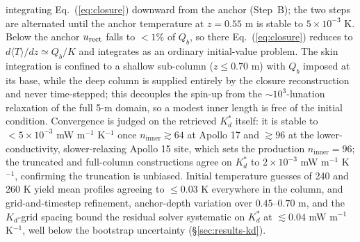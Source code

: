 \documentclass[11pt]{article}
\begin{document}
integrating Eq.~(\ref{eq:closure}) downward from the anchor (Step~B);
the two steps are alternated until the anchor temperature at $z=0.55$ m
is stable to $5\times10^{-3}$ K. Below the anchor $u_{\rm rect}$ falls
to $<\!1\%$ of $Q_b$, so there Eq.~(\ref{eq:closure}) reduces to
$d\langle T\rangle/dz\simeq Q_b/K$ and integrates as an ordinary
initial-value problem. The skin integration is
confined to a shallow sub-column ($z\le 0.70$ m) with $Q_b$ imposed at
its base, while the deep column is supplied entirely by the closure
reconstruction and never time-stepped; this decouples the spin-up from
the $\sim$$10^3$-lunation relaxation of the full 5-m domain, so a modest
inner length is free of the initial condition. Convergence is judged on
the retrieved $K_d^{*}$ itself: it is stable to
$<\!5\times10^{-3}$ mW m$^{-1}$ K$^{-1}$ once $n_\mathrm{inner}\gtrsim 64$
at Apollo 17 and $\gtrsim 96$ at the lower-conductivity, slower-relaxing
Apollo 15 site, which sets the production $n_\mathrm{inner}=96$; the
truncated and full-column constructions agree on $K_d^{*}$ to
$2\times10^{-3}$ mW m$^{-1}$ K$^{-1}$, confirming the truncation is
unbiased. Initial temperature guesses of 240 and 260 K yield mean
profiles agreeing to $\le 0.03$ K everywhere in the column, and
grid-and-timestep refinement, anchor-depth variation over
$0.45$--$0.70$ m, and the $K_d$-grid spacing bound the residual solver
systematic on $K_d^{*}$ at $\lesssim 0.04$ mW m$^{-1}$ K$^{-1}$, well
below the bootstrap uncertainty (\S\ref{sec:results-kd}).
\end{document}
